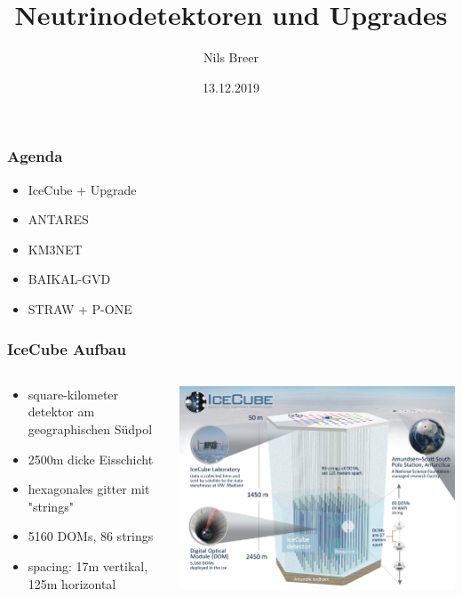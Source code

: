 \documentclass[aspectratio=1610, 9pt]{beamer}
\title{Neutrinodetektoren und Upgrades}
\author[N.Breer]{Nils Breer}
\institute{Fakultät Physik}
\date{13.12.2019}
\begin{document}
\maketitle

\begin{frame}\frametitle{Agenda}
  \begin{itemize}
    \item IceCube + Upgrade
    \item ANTARES
    \item KM3NET
    \item BAIKAL-GVD
    \item STRAW + P-ONE
  \end{itemize}
\end{frame}

\begin{frame}\frametitle{IceCube Aufbau}
  \begin{columns}
  \begin{column}[c]{0.45\textwidth}
    \begin{itemize}
      \item square-kilometer detektor am geographischen S\"udpol
      \item 2500m dicke Eisschicht
      \item hexagonales gitter mit "strings"
      \item 5160 DOMs, 86 strings
      \item spacing: 17m vertikal, 125m horizontal
    \end{itemize}
  \end{column}
  \begin{column}[c]{0.45\textwidth}
    \includegraphics{images/icecube.png}
  \end{column}
  \end{columns}
\end{frame}
\end{document}
